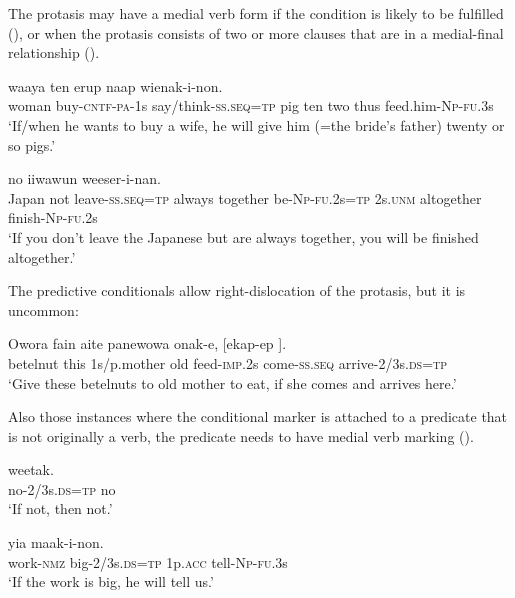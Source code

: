 The protasis may have a medial verb form if the condition is likely to be fulfilled (), or when the protasis consists of two or more clauses that are in a medial-final relationship ().

\ea%
\label{ex:x1654}
\gll [Emeria  \textstyleEmphasizedVernacularWords{sesenar-ek-a-m} \textstyleEmphasizedVernacularWords{na-ep=na}] waaya  ten  erup naap  wienak-i-non.\\
woman  buy-\textsc{cntf}-\textsc{pa}-1s say/think-\textsc{ss}.\textsc{seq}=\textsc{tp} pig  ten  two thus  feed.him-\textsc{Np}-\textsc{fu}.3s\\
\glt`If/when he wants to buy a wife, he will give him (=the bride's father) twenty or so pigs.'
\z


\ea%
\label{ex:x1653}
\gll [Yaapan  me  \textstyleEmphasizedVernacularWords{piipu-ap=na}  anane  epaskun  ika-i-nan=na] no  iiwawun  weeser-i-nan.
\\
Japan  not  leave-\textsc{ss}.\textsc{seq}=\textsc{tp} always together  be-\textsc{Np}-\textsc{fu}.2s=\textsc{tp} 2s.\textsc{unm} altogether  finish-\textsc{Np}-\textsc{fu}.2s\\
\glt`If you don't leave the Japanese but are always together, you will be finished altogether.'
\z


The predictive conditionals allow right-dislocation of the protasis, but it is uncommon: 

\ea%
\label{ex:x1662}
\gll Owora  fain  aite  panewowa  onak-e,  [ekap-ep ]. \\
betelnut  this  1s/p.mother  old  feed-\textsc{imp}.2s come-\textsc{ss}.\textsc{seq} arrive-2/3s.\textsc{ds}=\textsc{tp}\\
\glt`Give these betelnuts to old mother to eat, if she comes and arrives here.'
\z


Also those instances where the conditional marker is attached to a predicate that is not originally a verb, the predicate needs to have medial verb marking ().

\ea%
\label{ex:x1660}
\gll [\textstyleEmphasizedVernacularWords{Weetak-eya}\textstyleEmphasizedVernacularWords{=na}]  weetak.\\
no-2/3s.\textsc{ds}=\textsc{tp} no\\
\glt`If not, then not.'
\z


\ea%
\label{ex:x1661}
\gll [Mauw-owa  \textstyleEmphasizedVernacularWords{manek-aya=na}]  yia  maak-i-non.\\
work-\textsc{nmz} big-2/3s.\textsc{ds}=\textsc{tp} 1p.\textsc{acc} tell-\textsc{Np}-\textsc{fu}.3s\\
\glt`If the work is big, he will tell us.'
\z


